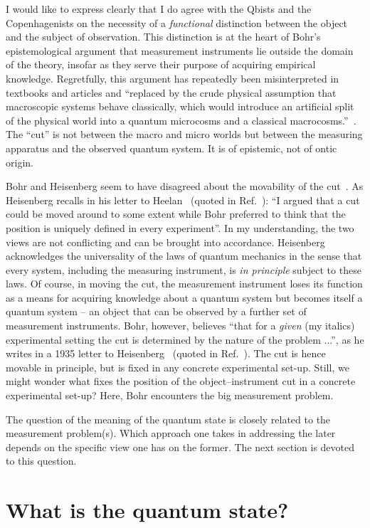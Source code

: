 \documentclass[12pt]{article}
\begin{document}
I would like to express clearly that I do agree with the Qbists and the Copenhagenists on the necessity of a {\it functional} distinction between the object and the subject of observation. This distinction is at the heart of Bohr's epistemological argument that measurement instruments lie outside the domain of the theory, insofar as they serve their purpose of acquiring empirical knowledge. Regretfully, this argument has repeatedly been misinterpreted in textbooks and articles and ``replaced by the crude physical assumption that macroscopic systems behave classically, which would introduce an artificial split of the physical world into a quantum microcosms and a classical macrocosms.''~\cite{osnaghi}. The ``cut'' is not between the macro and micro worlds but between the measuring apparatus and the observed quantum system. It is of epistemic, not of ontic origin. 

Bohr and Heisenberg seem to have disagreed about the movability of the cut~\cite{max}. As Heisenberg recalls in his letter to Heelan~\cite{heelan} (quoted in Ref.~\cite{max}): ``I argued that a cut could be moved around to some extent while Bohr preferred to think that the position is uniquely defined in every experiment''. In my understanding, the two views are not conflicting and can be brought into accordance. Heisenberg acknowledges the universality of the laws of quantum mechanics in the sense that every system, including the measuring instrument, is {\it in principle} subject to these laws. Of course, in moving the cut, the measurement instrument loses its function as a means for acquiring knowledge about a quantum system but becomes itself a quantum system -- an object that can be observed by a further set of measurement instruments. Bohr, however, believes ``that for a {\it given} (my italics) experimental setting the cut is determined by the nature of the problem ...'', as he writes in a 1935 letter to Heisenberg~\cite{AHQP} (quoted in Ref.~\cite{max}). The cut is hence movable in principle, but is fixed in any concrete experimental set-up. Still, we might wonder what fixes the position of the object--instrument cut in a concrete experimental set-up? Here, Bohr encounters the big measurement problem. 

The question of the meaning of the quantum state is closely related to the measurement problem(s). Which approach one takes in addressing the later depends on the specific view one has on the former. The next section is devoted to this question. 

\section{What is the quantum state?}
\end{document}
